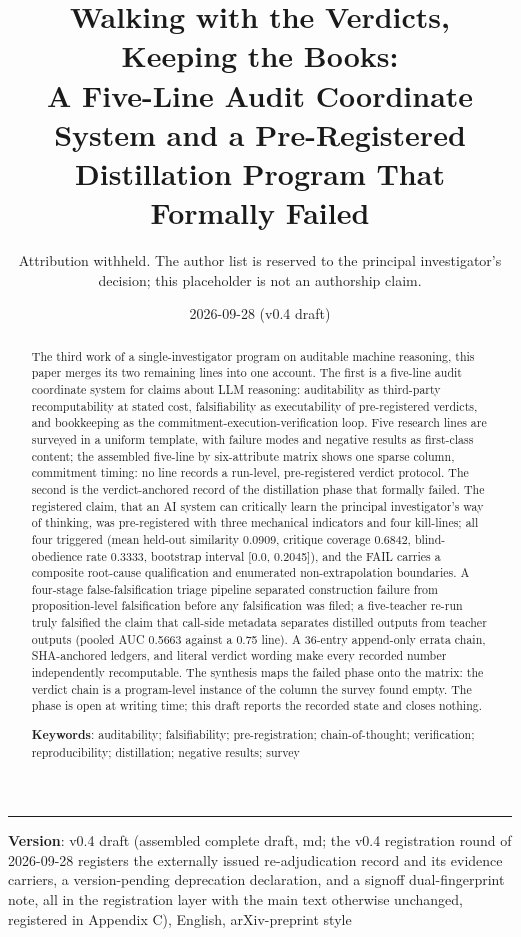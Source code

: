 \documentclass[11pt]{article}
\title{\bfseries Walking with the Verdicts, Keeping the Books:\\ A Five-Line Audit Coordinate System and a Pre-Registered\\ Distillation Program That Formally Failed}
\author{Attribution withheld. The author list is reserved to the principal investigator's decision; this placeholder is not an authorship claim.}
\date{2026-09-28 (v0.4 draft)}
\begin{document}
\maketitle
\thispagestyle{empty}

\begin{abstract}
The third work of a single-investigator program on auditable machine reasoning, this paper merges its two remaining lines into one account. The first is a five-line audit coordinate system for claims about LLM reasoning: auditability as third-party recomputability at stated cost, falsifiability as executability of pre-registered verdicts, and bookkeeping as the commitment-execution-verification loop. Five research lines are surveyed in a uniform template, with failure modes and negative results as first-class content; the assembled five-line by six-attribute matrix shows one sparse column, commitment timing: no line records a run-level, pre-registered verdict protocol. The second is the verdict-anchored record of the distillation phase that formally failed. The registered claim, that an AI system can critically learn the principal investigator's way of thinking, was pre-registered with three mechanical indicators and four kill-lines; all four triggered (mean held-out similarity 0.0909, critique coverage 0.6842, blind-obedience rate 0.3333, bootstrap interval [0.0, 0.2045]), and the FAIL carries a composite root-cause qualification and enumerated non-extrapolation boundaries. A four-stage false-falsification triage pipeline separated construction failure from proposition-level falsification before any falsification was filed; a five-teacher re-run truly falsified the claim that call-side metadata separates distilled outputs from teacher outputs (pooled AUC 0.5663 against a 0.75 line). A 36-entry append-only errata chain, SHA-anchored ledgers, and literal verdict wording make every recorded number independently recomputable. The synthesis maps the failed phase onto the matrix: the verdict chain is a program-level instance of the column the survey found empty. The phase is open at writing time; this draft reports the recorded state and closes nothing.

\medskip\noindent\textbf{Keywords}: auditability; falsifiability; pre-registration; chain-of-thought; verification; reproducibility; distillation; negative results; survey
\end{abstract}
\vspace{0.5em}\hrule\vspace{0.8em}
\noindent \textbf{Version}: v0.4 draft (assembled complete draft, md; the v0.4 registration round of 2026-09-28 registers the externally issued re-adjudication record and its evidence carriers, a version-pending deprecation declaration, and a signoff dual-fingerprint note, all in the registration layer with the main text otherwise unchanged, registered in Appendix C), English, arXiv-preprint style\par\smallskip
\end{document}
